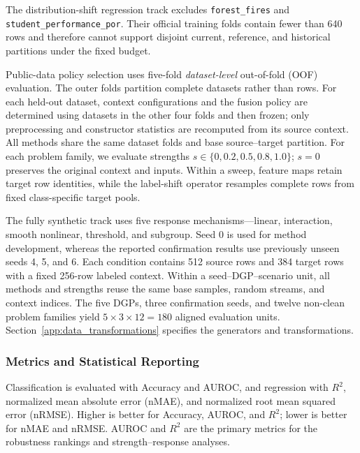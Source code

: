 The distribution-shift regression track excludes \nolinkurl{forest_fires} and
\nolinkurl{student_performance_por}.  Their official training folds contain
fewer than 640 rows and therefore cannot support disjoint current, reference,
and historical partitions under the fixed budget.

Public-data policy selection uses five-fold \emph{dataset-level} out-of-fold
(OOF) evaluation. The outer folds partition complete datasets rather than rows.
For each held-out dataset, context configurations and the fusion policy are
determined using datasets in the other four folds and then frozen; only
preprocessing and constructor statistics are recomputed from its source context.
All methods share the same dataset folds and base source--target partition.
For each problem family, we evaluate strengths
$s\in\{0,0.2,0.5,0.8,1.0\}$; $s=0$ preserves the original context and inputs.
Within a sweep, feature maps retain target row identities, while the label-shift
operator resamples complete rows from fixed class-specific target pools.

The fully synthetic track uses five response mechanisms---linear,
interaction, smooth nonlinear, threshold, and subgroup.  Seed 0 is used for
method development, whereas the reported confirmation results use previously
unseen seeds 4, 5, and 6.  Each condition contains 512 source rows and 384
target rows with a fixed 256-row labeled context.  Within a
seed--DGP--scenario unit, all methods and strengths reuse the same base samples,
random streams, and context indices.  The five DGPs, three confirmation seeds,
and twelve non-clean problem families yield $5\times3\times12=180$ aligned
evaluation units.  Section~\ref{app:data_transformations} specifies the
generators and transformations.

\subsubsection{Metrics and Statistical Reporting}
\label{app:metrics_reporting}

Classification is evaluated with Accuracy and AUROC, and regression with
$R^2$, normalized mean absolute error (nMAE), and normalized root mean squared
error (nRMSE).  Higher is better for Accuracy, AUROC, and $R^2$; lower is
better for nMAE and nRMSE.  AUROC and $R^2$ are the primary metrics for the
robustness rankings and strength--response analyses.

